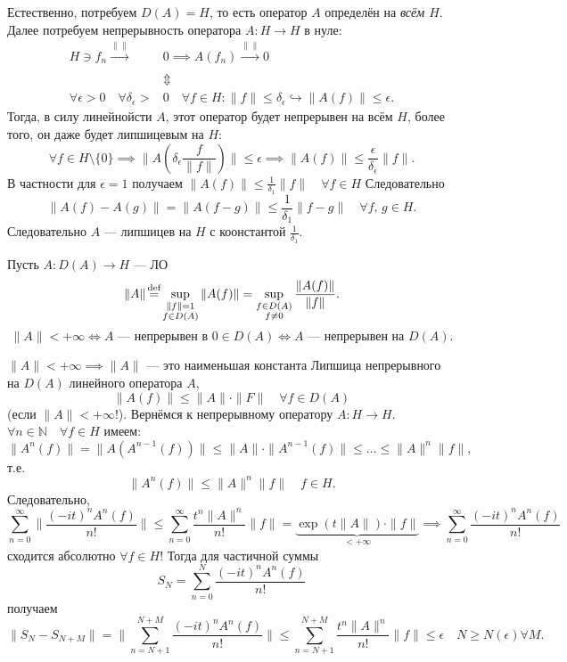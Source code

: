 \documentclass[a4paper]{article}
\begin{document}
Естественно, потребуем $D(A) =H$, то есть оператор $A$ определён
на \emph{всём $H$}. Далее потребуем непрерывность оператора
$A: H\to H$ в нуле:
\begin{align*}
	H \ni f_n \xrightarrow[]{\| \|} &0 \implies A(f_n)
	\xrightarrow[]{\| \|}0\\
					&\Updownarrow\\
	\forall \epsilon > 0 \quad \forall \delta_\epsilon >&0
\quad \forall f \in H: \| f\|\le \delta_\epsilon \hookrightarrow
\| A(f)\|\le \epsilon
.\end{align*}
Тогда, в силу линейнойсти $A$, этот оператор будет непрерывен
 на всём $H$, более того, он даже будет
липшицевым на $H$:
\[
	\forall f \in  H \setminus \{0\} \implies \| A\left( 
	\delta_\epsilon \frac{f}{\| f\|}\right) \|\le \epsilon
	\implies \| A(f)\|\le  \frac{\epsilon}{\delta_\epsilon}
	\| f\|
.\] 
В частности для $\epsilon=1$ получаем $\| A(f)\|\le \frac{1}{\delta_{1}}\| f\|\quad \forall f \in H$
Следовательно
\[
	\| A(f)-A(g)\|=\| A(f-g)\|\le \frac{1}{\delta_1}\| f-g\|
	\quad \forall f,\,g \in H
.\] 
Следовательно $A$ --- липшицев на $H$ с коонстантой $\frac{1}{\delta_1}$.
\begin{dfn}
	Пусть $A: D(A) \to  H$ --- ЛО
	\[
	\| A\|\textover{=}{def} \sup_{\substack{\| f\|=1\\
	f \in  D(A)}}\| A(f)\|=
	\sup_{\substack{f \in D(A)\\ f \neq 0}}\frac{\| A(f)\|}{
	\| f\|}
	.\] 
	\[
\| A\|<+\infty \Leftrightarrow A \text{ --- непрерывен в }
0 \in  D(A) \Leftrightarrow A \text{ --- непрерывен на } D(A)
	.\] 
\end{dfn}
$\| A\|<+\infty \implies \| A\|$ --- это наименьшая
константа Липшица непрерывного на $D(A)$ линейного оператора $A$,
\[
	\| A(f)\|\le \| A\|\cdot \| F\| \quad \forall f \in 
	D(A)
\]
(если $\| A\|<+\infty$!).
Вернёмся к непрерывному оператору $A: H \to H$. $\forall n \in 
 \mathbb{N} \quad \forall f \in  H$ имеем:
 \[
	 \| A^n(f)\|=\| A(A^{n-1}(f))\|\le 
	 \| A\|\cdot \| A^{n-1}(f)\|\le \ldots
	 \le \| A\|^{n} \| f\|,
 \] 
 т.\:е.
 \[
	 \| A^{n}(f)\|\le  \| A\|^n \| f\| \quad f \in H
 .\] 
 Следовательно,
 \[
	 \sum_{n=0}^{\infty} \| \frac{(-it)^nA^n(f)}{n!}\|\le 
	 \sum_{n=0}^{\infty} \frac{t^n \| A\|^n}{n!}\| f\|=
	 \underbrace{\exp\left( t \| A\| \right) \cdot \| f\|}_{<+\infty}\implies \sum_{n=0}^{\infty} \frac{(-it)^nA^n(f)}{n!}
 \] 
 сходится абсолютно $\forall f \in  H$!
 Тогда для частичной суммы
 \[
	 S_N = \sum_{n=0}^{N} \frac{(-it)^n A^n(f)}{n!}
 \]
 получаем
 \[
	 \| S_N-S_{N+M}\|= \| \sum_{n=N+1}^{N+M} \frac{(-it)^n
	 A^n(f)}{n!}\|\le \sum_{n=N+1}^{N+M} \frac{t^n \| A\|^n}{n!}
	 \| f\| \le \epsilon \quad N \ge N(\epsilon) \forall M
 .\] 
\end{document}

